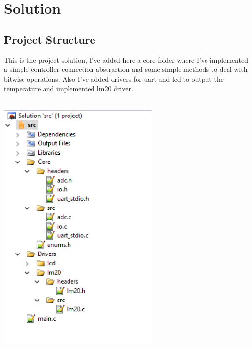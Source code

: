 \section{Solution}

\subsection{Project Structure}
This is the project solution, I've added here a core folder where I've implemented a simple controller connection abstraction and some simple methods to deal with bitwise operations. Also I've added drivers for uart and lcd to output the temperature and implemented lm20 driver.\\\\

\centerline{
	\includegraphics[width=0.6\textwidth]{solution/images/src.png}
}



